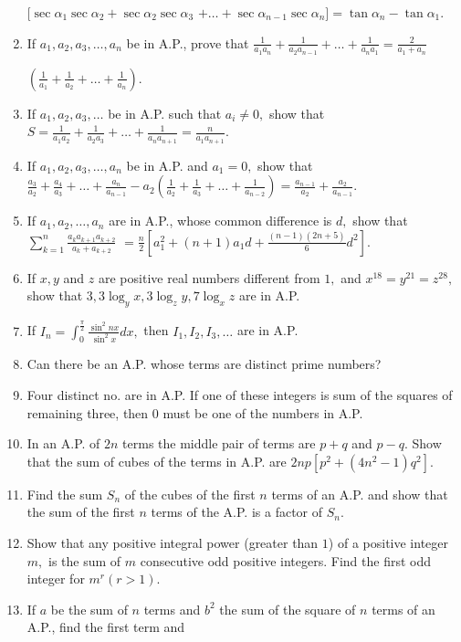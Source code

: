 \begin{enumerate}
  $[\sec\alpha_1\sec\alpha_2 + \sec\alpha_2\sec\alpha_3$ $+ \ldots + \sec\alpha_{n - 1}\sec\alpha_n] = \tan\alpha_n -
  \tan\alpha_1$.
\item If $a_1, a_2, a_3, \ldots, a_n$ be in A.P., prove that $\frac{1}{a_1a_n} + \frac{1}{a_2a_{n - 1}} + \ldots +
  \frac{1}{a_na_1} =\frac{2}{a_1 + a_n}$

  $\left(\frac{1}{a_1} + \frac{1}{a_2} + \ldots + \frac{1}{a_n}\right)$.
\item If $a_1, a_2, a_3, \ldots$ be in A.P. such that $a_i\neq 0,$ show that $S = \frac{1}{a_1a_2} + \frac{1}{a_2a_3}
  + \ldots + \frac{1}{a_na_{n + 1}} = \frac{n}{a_1a_{n + 1}}$.
\item If $a_1, a_2, a_3, \ldots, a_n$ be in A.P. and $a_1 = 0,$ show that $\frac{a_3}{a_2} + \frac{a_4}{a_3} + \ldots +
  \frac{a_n}{a_{n - 1}} - a_2\left(\frac{1}{a_2} + \frac{1}{a_3} + \ldots + \frac{1}{a_{n - 2}}\right) = \frac{a_{n - 1}}{a_2} +
  \frac{a_2}{a_{n - 1}}$.
\item If $a_1, a_2, \ldots, a_n$ are in A.P., whose common difference is $d,$ show that $\sum_{k = 1}^n\frac{a_ka_{k +
    1}a_{k + 2}}{a_k+a_{k + 2}}$ $= \frac{n}{2}\left[a_1^2 + (n + 1)a_1d + \frac{(n - 1)(2n + 5)}{6}d^2\right]$.
\item If $x, y$ and $z$ are positive real numbers different from $1,$ and $x^{18} = y^{21} = z^{28},$ show that $3, 3\log_y
  x, 3\log_z y, 7\log_x z$ are in A.P.
\item If $I_n = \int_{0}^{\frac{\pi}{2}}\frac{\sin^2nx}{\sin^2x}dx,$ then $I_1, I_2, I_3, \ldots$ are in A.P.
\item Can there be an A.P. whose terms are distinct prime numbers?
\item Four distinct no. are in A.P. If one of these integers is sum of the squares of remaining three, then $0$ must be
  one of the numbers in A.P.
\item In an A.P. of $2n$ terms the middle pair of terms are $p + q$ and $p - q.$ Show that the sum of cubes of the terms
  in A.P. are $2np[p^2 + (4n^2 - 1)q^2]$.
\item Find the sum $S_n$ of the cubes of the first $n$ terms of an A.P. and show that the sum of the first $n$ terms of
  the A.P. is a factor of $S_n$.
\item Show that any positive integral power (greater than $1$) of a positive integer $m,$ is the sum of $m$ consecutive
  odd positive integers. Find the first odd integer for $m^r(r > 1)$.
\item If $a$ be the sum of $n$ terms and $b^2$ the sum of the square of $n$ terms of an A.P., find the first term and

\end{enumerate}
